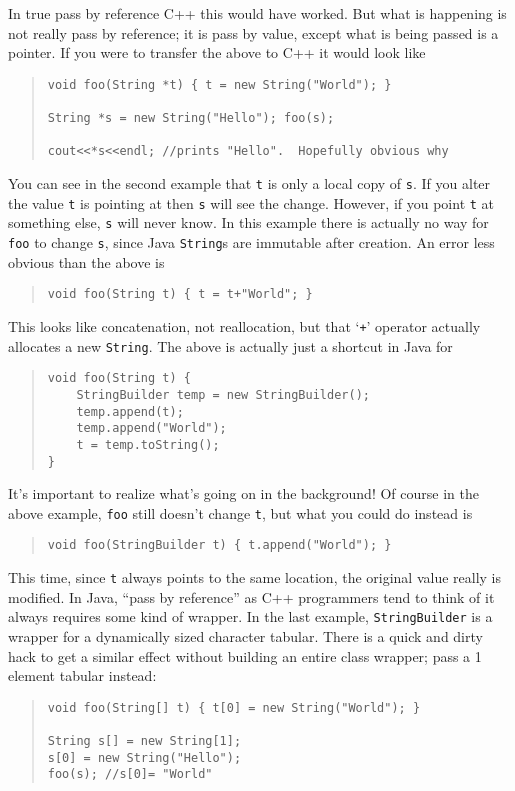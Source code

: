 \documentclass[12pt]{article}
\begin{document}
In true pass by reference C++ this would have worked.  But what is
happening is not really pass by reference; it is pass by value, except
what is being passed is a pointer.  If you were to transfer the above
to C++ it would look like
\begin{quote}
\begin{verbatim}
void foo(String *t) { t = new String("World"); }

String *s = new String("Hello"); foo(s);

cout<<*s<<endl; //prints "Hello".  Hopefully obvious why
\end{verbatim}
\end{quote}

You can see in the second example that \texttt{t} is only a local copy
of \texttt{s}.  If you alter the value \texttt{t} is pointing at then
\texttt{s} will see the change.  However, if you point \texttt{t} at
something else, \texttt{s} will never know.  In this example there is
actually no way for \texttt{foo} to change \texttt{s}, since Java
\texttt{String}s are immutable after creation.  An error less obvious
than the above is
\begin{quote}
\begin{verbatim}
void foo(String t) { t = t+"World"; }
\end{verbatim}
\end{quote}

This looks like concatenation, not reallocation, but that `\texttt{+}'
operator actually allocates a new \texttt{String}.  The above is
actually just a shortcut in Java for
\begin{quote}
\begin{verbatim}
void foo(String t) {
    StringBuilder temp = new StringBuilder();
    temp.append(t);
    temp.append("World");
    t = temp.toString();
}
\end{verbatim}
\end{quote}

It's important to realize what's going on in the background!  Of
course in the above example, \texttt{foo} still doesn't change
\texttt{t}, but what you could do instead is
\begin{quote}
\begin{verbatim}
void foo(StringBuilder t) { t.append("World"); }
\end{verbatim}
\end{quote}

This time, since \texttt{t} always points to the same location, the
original value really is modified.  In Java, ``pass by reference'' as
C++ programmers tend to think of it always requires some kind of
wrapper.  In the last example, \texttt{StringBuilder} is a wrapper for
a dynamically sized character tabular.  There is a quick and dirty
hack to get a similar effect without building an entire class wrapper;
pass a 1 element tabular instead:
\begin{quote}
\begin{verbatim}
void foo(String[] t) { t[0] = new String("World"); }

String s[] = new String[1];
s[0] = new String("Hello");
foo(s); //s[0]= "World"
\end{verbatim}
\end{quote}
\end{document}
